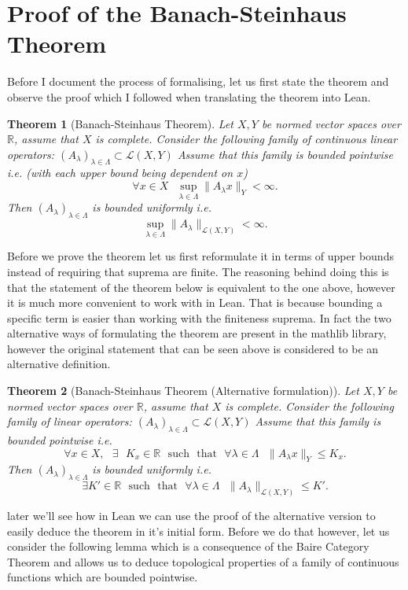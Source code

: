\documentclass[11pt]{article}
\newcommand\R{\mathbb{R}}
\newcommand\sucht{\sep \mathrm{such} \sep \mathrm{that} \sep}
\newcommand\sep{\text{ }}
\newtheorem*{theorem}{Theorem}
\begin{document}
\section*{Proof of the Banach-Steinhaus Theorem}

Before I document the process of formalising, let us first state the
theorem and observe the proof which I followed when translating the theorem
into Lean.
\begin{theorem}[Banach-Steinhaus Theorem]
  Let $X, Y$ be normed vector spaces over $\R$, assume that $X$ is complete. Consider
  the following family of continuous linear operators:
  $\left( A_\lambda \right)_{\lambda \in \Lambda} \subset \mathcal{L}\left( X, Y \right) $
  Assume that this family is bounded pointwise i.e. (with each upper bound being dependent on $x$)
  \[
    \forall x \in X \sep \sup_{\lambda \in \Lambda} \|A_\lambda x\|_Y < \infty
  .\]
  Then $\left( A_\lambda \right)_{\lambda \in \Lambda}$ is bounded uniformly i.e.
  \[
    \sup_{\lambda \in \Lambda} \|A_\lambda \|_{\mathcal{L}\left( X, Y \right) } < \infty
  .\]
\end{theorem}
Before we prove the theorem let us first reformulate it in terms of upper
bounds instead of requiring that suprema are finite. The reasoning behind doing
this is that the statement of the theorem below is equivalent to the one above,
however it is much more convenient to work with in Lean. That is because
bounding a specific term is easier than working with the finiteness suprema. In
fact the two alternative ways of formulating the theorem are present in the
mathlib library, however the original statement that can be seen above is
considered to be an alternative definition.

\begin{theorem}[Banach-Steinhaus Theorem (Alternative formulation)]
  Let $X, Y$ be normed vector spaces over $\R$, assume that $X$ is complete. Consider
  the following family of linear operators:
  $\left( A_\lambda \right)_{\lambda \in \Lambda} \subset \mathcal{L}\left( X, Y \right) $
  Assume that this family is bounded pointwise i.e.
  \[
    \forall x \in X, \sep \exists \sep K_x \in \R \sucht \forall \lambda \in \Lambda \sep \|A_\lambda x\|_Y \le K_x
  .\]
  Then $\left( A_\lambda \right)_{\lambda \in \Lambda}$ is bounded uniformly i.e.
  \[
    \exists K' \in \R \sucht \forall \lambda \in \Lambda \sep \|A_\lambda \|_{\mathcal{L}\left( X, Y \right) } \le K'  .\]
\end{theorem}

later we'll see how in Lean
we can use the proof of the alternative version to easily deduce the theorem in it's
initial form. Before we do that however, let us consider the following lemma which
is a consequence of the Baire Category Theorem and allows us to deduce topological
properties of a family of continuous functions which are bounded pointwise.
\end{document}
